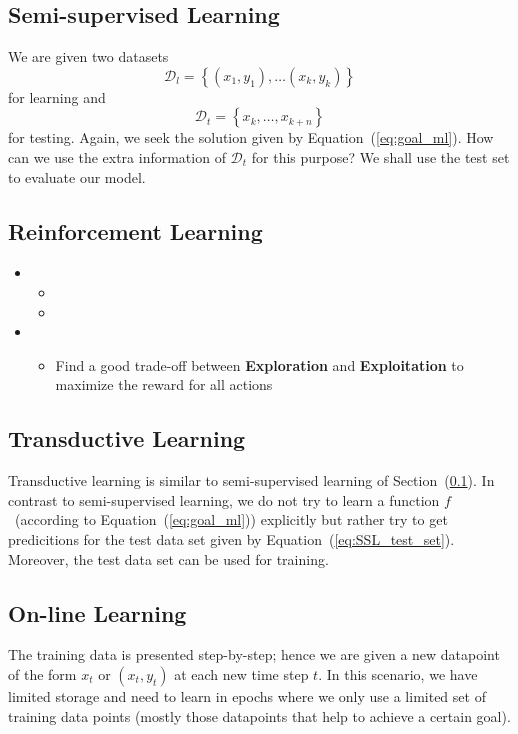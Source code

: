 \subsection{Semi-supervised Learning}\label{ssec:SSL}
We are given two datasets %
\begin{equation}
\mathcal{D}_l = \left\{(x_1,y_1),\ldots(x_k,y_k)\right\}
\label{eq:SSL_train_set}
\end{equation}
for learning and %
\begin{equation}
\mathcal{D}_t = \left\{x_k,\ldots,x_{k+n}\right\}
\label{eq:SSL_test_set}
\end{equation}
for testing. %
Again, we seek the solution given by Equation~(\ref{eq:goal_ml}). %
How can we use the extra information of $\mathcal{D}_t$ for this purpose? %
We shall use the test set to evaluate our model. %
\subsection{Reinforcement Learning}
\begin{itemize}
	\item{}
	\begin{itemize}
		\item{}%
		\item{}%
	\end{itemize}
	\item{}%
	\begin{itemize}
		\item Find a good trade-off between \textbf{Exploration} and \textbf{Exploitation} to maximize the reward for all actions
	\end{itemize}
\end{itemize}
%
%
%
\subsection{Transductive Learning}
Transductive learning is similar to semi-supervised learning of Section~(\ref{ssec:SSL}). %
In contrast to semi-supervised learning, we do not try to learn a function $f$~(according to Equation~(\ref{eq:goal_ml})) explicitly but rather try to get predicitions for the test data set given by Equation~(\ref{eq:SSL_test_set}). %
Moreover, the test data set can be used for training. %
%
%
%
\subsection{On-line Learning}
The training data is presented step-by-step; hence we are given a new datapoint of the form $x_t$ or $(x_t,y_t)$ at each new time step $t$. %
In this scenario, we have limited storage and need to learn in epochs where we only use a limited set of training data points (mostly those datapoints that help to achieve a certain goal). %
%
%
%
